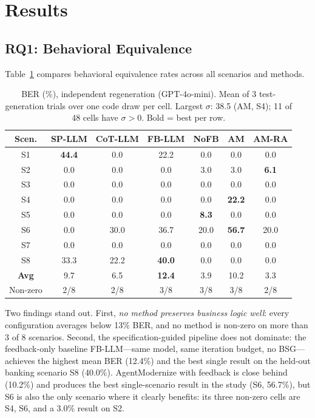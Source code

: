 \documentclass[conference]{IEEEtran}
\begin{document}
\section{Results}
\label{sec:fair-eval}

\subsection{RQ1: Behavioral Equivalence}

Table~\ref{tab:rq1} compares behavioral equivalence rates across all scenarios and methods.

\begin{table}[htbp]
\caption{BER (\%), independent regeneration (GPT-4o-mini). Mean of 3 test-generation trials over one code draw per cell. Largest $\sigma$: 38.5 (AM, S4); 11 of 48 cells have $\sigma>0$. Bold = best per row.}
\label{tab:rq1}
\centering
\scriptsize
\begin{tabular}{@{}ccccccc@{}}
\toprule
\textbf{Scen.} & \textbf{SP-LLM} & \textbf{CoT-LLM} & \textbf{FB-LLM} & \textbf{NoFB} & \textbf{AM} & \textbf{AM-RA} \\
\midrule
S1 & \textbf{44.4} & 0.0 & 22.2 & 0.0 & 0.0 & 0.0 \\
S2 & 0.0 & 0.0 & 0.0 & 3.0 & 3.0 & \textbf{6.1} \\
S3 & 0.0 & 0.0 & 0.0 & 0.0 & 0.0 & 0.0 \\
S4 & 0.0 & 0.0 & 0.0 & 0.0 & \textbf{22.2} & 0.0 \\
S5 & 0.0 & 0.0 & 0.0 & \textbf{8.3} & 0.0 & 0.0 \\
S6 & 0.0 & 30.0 & 36.7 & 20.0 & \textbf{56.7} & 20.0 \\
S7 & 0.0 & 0.0 & 0.0 & 0.0 & 0.0 & 0.0 \\
S8 & 33.3 & 22.2 & \textbf{40.0} & 0.0 & 0.0 & 0.0 \\
\midrule
\textbf{Avg} & 9.7 & 6.5 & \textbf{12.4} & 3.9 & 10.2 & 3.3 \\
Non-zero & 2/8 & 2/8 & 3/8 & 3/8 & 3/8 & 2/8 \\
\bottomrule
\end{tabular}
\end{table}

Two findings stand out. First, \emph{no method preserves business logic well}: every configuration averages below 13\% BER, and no method is non-zero on more than 3 of 8 scenarios. Second, the specification-guided pipeline does not dominate: the feedback-only baseline FB-LLM---same model, same iteration budget, no BSG---achieves the highest mean BER (12.4\%) and the best single result on the held-out banking scenario S8 (40.0\%). AgentModernize with feedback is close behind (10.2\%) and produces the best single-scenario result in the study (S6, 56.7\%), but S6 is also the only scenario where it clearly benefits: its three non-zero cells are S4, S6, and a 3.0\% result on S2.
\end{document}
